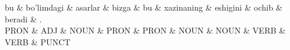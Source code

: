 \documentclass{standalone}
\begin{document}
\begin{dependency}[theme=simple]
  \begin{deptext}[column sep=0.45cm]
    bu \& bo'limdagi \& asarlar \& bizga \& bu \& xazinaning \& eshigini \& ochib \& beradi \& . \\
    PRON \& ADJ \& NOUN \& PRON \& PRON \& NOUN \& NOUN \& VERB \& VERB \& PUNCT \\
  \end{deptext}
\end{dependency}
\end{document}
